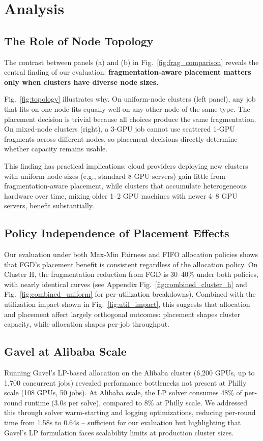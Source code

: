 \documentclass[conference]{IEEEtran}
\begin{document}
\section{Analysis}

\subsection{The Role of Node Topology}
The contrast between panels (a) and (b) in Fig.~\ref{fig:frag_comparison} reveals the central finding of our evaluation: \textbf{fragmentation-aware placement matters only when clusters have diverse node sizes.}

Fig.~\ref{fig:topology} illustrates why.
On uniform-node clusters (left panel), any job that fits on one node fits equally well on any other node of the same type.
The placement decision is trivial because all choices produce the same fragmentation.
On mixed-node clusters (right), a 3-GPU job cannot use scattered 1-GPU fragments across different nodes, so placement decisions directly determine whether capacity remains usable.

This finding has practical implications: cloud providers deploying new clusters with uniform node sizes (e.g., standard 8-GPU servers) gain little from fragmentation-aware placement, while clusters that accumulate heterogeneous hardware over time, mixing older 1--2 GPU machines with newer 4--8 GPU servers, benefit substantially.

\subsection{Policy Independence of Placement Effects}
Our evaluation under both Max-Min Fairness and FIFO allocation policies shows that FGD's placement benefit is consistent regardless of the allocation policy.
On Cluster H, the fragmentation reduction from FGD is 30--40\% under both policies, with nearly identical curves (see Appendix Fig.~\ref{fig:combined_cluster_h} and Fig.~\ref{fig:combined_uniform} for per-utilization breakdowns).
Combined with the utilization impact shown in Fig.~\ref{fig:util_impact}, this suggests that allocation and placement affect largely orthogonal outcomes: placement shapes cluster capacity, while allocation shapes per-job throughput.

\subsection{Gavel at Alibaba Scale}
Running Gavel's LP-based allocation on the Alibaba cluster (6,200 GPUs, up to 1,700 concurrent jobs) revealed performance bottlenecks not present at Philly scale (108 GPUs, 50 jobs).
At Alibaba scale, the LP solver consumes 48\% of per-round runtime (3.0s per solve), compared to 8\% at Philly scale.
We addressed this through solver warm-starting and logging optimizations, reducing per-round time from 1.58s to 0.64s -- sufficient for our evaluation but highlighting that Gavel's LP formulation faces scalability limits at production cluster sizes.
\end{document}
